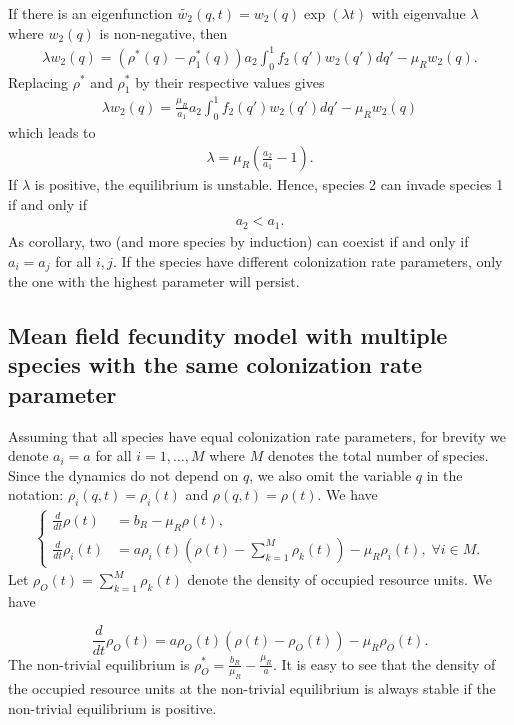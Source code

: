 \documentclass[8pt,a4paper]{article}
\begin{document}
If there is an eigenfunction $\tilde{w_2}(q,t)= w_2(q) \exp(\lambda t)$ with eigenvalue $\lambda$ where $w_2(q)$ is non-negative, then
\begin{eqnarray*}
\lambda w_2(q)= (\rho^*(q)-\rho_1^*(q))a_2 \int_0^1 f_2(q') w_2(q') dq' - \mu_R w_2(q).
\end{eqnarray*} 
Replacing $\rho^*$ and $\rho_1^*$  by their respective values gives
\begin{eqnarray*}
\lambda w_2(q)= \frac{\mu_R}{a_1}a_2 \int_0^1 f_2(q') w_2(q') dq' - \mu_R w_2(q)
\end{eqnarray*} 
which leads to
\begin{eqnarray*}
 \lambda =  \mu_R (\frac{a_2}{a_1} -1).
\end{eqnarray*} 
 If $\lambda$ is positive, the equilibrium is unstable. Hence, species 2 can invade species 1 if and only if
\begin{eqnarray*}
  a_2 < a_1.
\end{eqnarray*}
As corollary, two (and more species by induction) can coexist if and only if $a_i = a_j$ for all $i, j$. If the species have different colonization rate parameters, only the one with the highest parameter will persist.

\subsection{ Mean field fecundity model with multiple species with the same colonization rate parameter}

Assuming that all species have equal colonization rate parameters, for brevity we denote $a_i = a $ for all $i= 1,\ldots, M$ where $M$ denotes the total number of species. Since the dynamics do not depend on $q$, we also omit the variable $q$ in the notation: $\rho_i(q,t)=\rho_i(t)$ and $\rho(q,t)=\rho(t)$. We have
\begin{eqnarray}
\begin{cases}
\displaystyle{\frac{d}{dt}}\rho(t) &= b_R-\mu_R \rho(t), \\
\displaystyle{\frac{d}{dt}}\rho_i(t) &= a \rho_i(t)  \left(\rho(t)- \sum_{k=1}^M \rho_k(t)\right) -\mu_R \rho_i(t), \;  \forall i \in M.
\end{cases}
\end{eqnarray}
Let $\rho_O(t)= \sum_{k=1}^M \rho_k(t)$ denote the density of occupied resource units. We have

\begin{equation*}
\frac{d}{dt} \rho_O(t)= a\rho_O(t)(\rho(t)-\rho_O(t)) -\mu_R \rho_O(t).
\end{equation*}
The non-trivial equilibrium is $\displaystyle{\rho_O^* = \frac{b_R}{\mu_R}-\frac{\mu_R}{a}}.$ It is easy to see that the density of the occupied resource units at the non-trivial equilibrium is always stable if the non-trivial equilibrium is positive.
\end{document}
